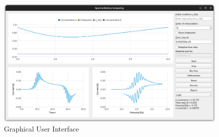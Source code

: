 \documentclass{prettytex/ox/mmsc-special-topic}
\title{\topictitle}
\author{Candidate \candidatenumber}
\date{\today}
\begin{document}
  \pagestyle{plain}
  \mmscSpecialHeader[casestudy]

  \begin{abstract}
    \label{abstract}
    This work shall attempt to
    \vspace*{0.2cm}

    \noindent
    \textbf{Our Goal:}
    Numerically obtain the solution $\{a(x, T), b(x, T)\}$ of
    \vspace*{-0.2cm}
    $$\begin{cases}
        \frac{\partial a}{\partial t} = D_a \frac{\partial^2 a}{\partial x^2}, & a: \R^+ \times [0, T] \mapsto [0, 1],\, T \in \R^+,\; D_a \in \R^+, \\[-0.2em]
        \frac{\partial b}{\partial t} = D_b \frac{\partial^2 b}{\partial x^2}, & b: \R^+ \times [0, T] \mapsto [0, 1],\, D_b \in \R^+,               \\[-0.2em]
        a(\infty, t) = 1,\; b(\infty, t) = 0                                   & \forall t \in [0, T]                                                \\[-0.2em]
        a(x, 0) = 1,\;\; b(x, 0) = 0                                           & \forall x \in (0, \infty)                                           \\[-0.2em]
        a(0, t) = 0,\; \frac{\partial a}{\partial x} + D \frac{\partial b}{\partial x} = 0
      \end{cases}$$
    \vspace*{0.05cm}

    The implementation bla bla
  \end{abstract}

  \begin{figure}[H]
    \centering
    \includegraphics[width=\linewidth]{figures/screenshot.png}
    \caption{Graphical User Interface}
  \end{figure}
\end{document}
